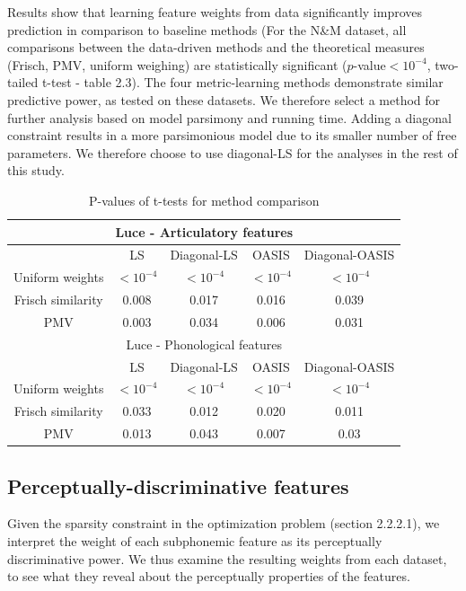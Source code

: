 Results show that learning feature weights from data significantly improves prediction in comparison to baseline methods (For the N\&M dataset, all comparisons between the data-driven methods and the theoretical measures (Frisch, PMV, uniform weighing) are statistically significant ($p$-value$<10^{-4}$, two-tailed t-test - table 2.3). The four metric-learning methods demonstrate similar predictive power, as tested on these datasets. We therefore select a method for further analysis based on model parsimony and running time. Adding a diagonal constraint results in a more parsimonious model due to its smaller number of free parameters. We therefore choose to use diagonal-LS for the analyses in the rest of this study.

\begin{table}[H]
    \centering
    \begin{tabular}{|c|c|c|c|c|}
        \hline
        \multicolumn{5}{|c|}{Luce - Articulatory features}\\
        \hline
         & LS & Diagonal-LS & OASIS & Diagonal-OASIS \\
         \hline
         Uniform weights & $<10^{-4}$ & $<10^{-4}$ & $<10^{-4}$ & $<10^{-4}$ \\
         Frisch similarity & 0.008 &    0.017 &    0.016 &    0.039 \\
         PMV & 0.003 &    0.034 &    0.006 &    0.031 \\
         \hline
         \multicolumn{5}{|c|}{Luce - Phonological features}\\
         \hline
         & LS & Diagonal-LS & OASIS & Diagonal-OASIS \\
         \hline
         Uniform weights & $<10^{-4}$ &  $<10^{-4}$ & $<10^{-4}$ & $<10^{-4}$ \\
         Frisch similarity & 0.033 &    0.012 &    0.020 &    0.011 \\
         PMV & 0.013 &    0.043 &    0.007 &    0.03 \\
         \hline
         
    \end{tabular}
    \caption{P-values of t-tests for method comparison}
\end{table}


\subsection{Perceptually-discriminative features}
Given the sparsity constraint in the optimization problem (section 2.2.2.1), we interpret the weight of each subphonemic feature as its perceptually discriminative power. We thus examine the resulting weights from each dataset, to see what they reveal about the perceptually properties of the features.

